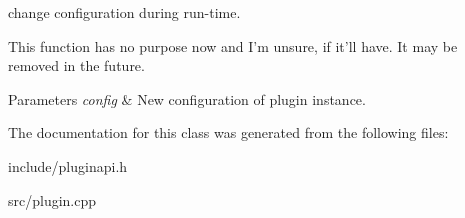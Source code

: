 change configuration during run-\/time. 

\-This function has no purpose now and \-I'm unsure, if it'll have. \-It may be removed in the future. 
\begin{DoxyParams}{\-Parameters}
{\em config} & \-New configuration of plugin instance. \\
\hline
\end{DoxyParams}


\-The documentation for this class was generated from the following files\-:\begin{DoxyCompactItemize}
\item 
include/pluginapi.\-h\item 
src/plugin.\-cpp\end{DoxyCompactItemize}
